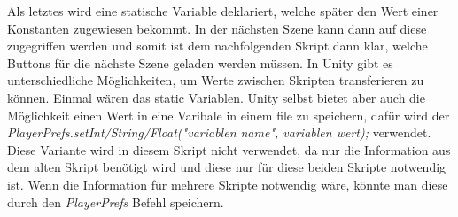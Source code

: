 Als letztes wird eine statische Variable deklariert, welche später den Wert einer Konstanten zugewiesen bekommt. In der nächsten Szene kann dann auf diese zugegriffen werden und somit ist dem nachfolgenden Skript dann klar, welche Buttons für die nächste Szene geladen werden müssen. In Unity gibt es unterschiedliche Möglichkeiten, um Werte zwischen Skripten transferieren zu können. Einmal wären das static Variablen. Unity selbst bietet aber auch die Möglichkeit einen Wert in eine Varibale in einem file zu speichern, dafür wird der \textit{PlayerPrefs.setInt/String/Float("variablen name", variablen wert);} verwendet. Diese Variante wird in diesem Skript nicht verwendet, da nur die Information aus dem alten Skript benötigt wird und diese nur für diese beiden Skripte notwendig ist. Wenn die Information für mehrere Skripte notwendig wäre, könnte man diese durch den \textit{PlayerPrefs} Befehl speichern.\\

